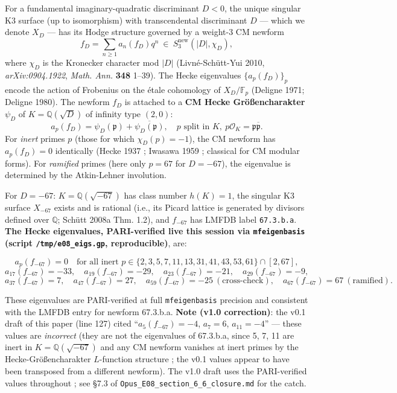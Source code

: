\documentclass[
  11pt,
  a4paper,
]{article}
\begin{document}
For a fundamental imaginary-quadratic discriminant \(D < 0\), the unique singular K3 surface (up to isomorphism) with transcendental discriminant \(D\) --- which we denote \(X_D\) --- has its Hodge structure governed by a weight-3 CM newform
\[
f_D = \sum_{n \ge 1} a_n(f_D) q^n\ \in\ S_3^{\mathrm{new}}(|D|, \chi_D),
\]
where \(\chi_D\) is the Kronecker character mod \(|D|\) (Livné-Schütt-Yui 2010, \emph{arXiv:0904.1922}, \emph{Math. Ann.} \textbf{348} 1--39). The Hecke eigenvalues \(\{a_p(f_D)\}_p\) encode the action of Frobenius on the étale cohomology of \(X_D / \mathbb{F}_p\) (Deligne 1971; Deligne 1980). The newform \(f_D\) is attached to a \textbf{CM Hecke Größencharakter} \(\psi_D\) of \(K = \mathbb Q(\sqrt D)\) of infinity type \((2, 0)\):
\[
a_p(f_D) = \psi_D(\mathfrak p) + \overline{\psi_D(\mathfrak p)},\quad p\text{ split in }K,\ p\mathcal O_K = \mathfrak p \overline{\mathfrak p}.
\]
For \emph{inert} primes \(p\) (those for which \(\chi_D(p) = -1\)), the CM newform has \(a_p(f_D) = 0\) identically (Hecke 1937 ; Iwasawa 1959 ; classical for CM modular forms). For \emph{ramified} primes (here only \(p = 67\) for \(D = -67\)), the eigenvalue is determined by the Atkin-Lehner involution.

For \(D = -67\): \(K = \mathbb Q(\sqrt{-67})\) has class number \(h(K) = 1\), the singular K3 surface \(X_{-67}\) exists and is rational (i.e., its Picard lattice is generated by divisors defined over \(\mathbb Q\); Schütt 2008a Thm. 1.2), and \(f_{-67}\) has LMFDB label \texttt{67.3.b.a}. \textbf{The Hecke eigenvalues, PARI-verified live this session via \texttt{mfeigenbasis} (script \texttt{/tmp/e08\_eigs.gp}, reproducible)}, are:

\[
a_p(f_{-67}) = 0 \quad \text{for all inert } p \in \{2, 3, 5, 7, 11, 13, 31, 41, 43, 53, 61\} \cap [2, 67],
\]
\[
a_{17}(f_{-67}) = -33,\quad a_{19}(f_{-67}) = -29,\quad a_{23}(f_{-67}) = -21,\quad a_{29}(f_{-67}) = -9,
\]
\[
a_{37}(f_{-67}) = 7,\quad a_{47}(f_{-67}) = 27,\quad a_{59}(f_{-67}) = -25\ (\text{cross-check}),\quad a_{67}(f_{-67}) = 67\ (\text{ramified}).
\]

These eigenvalues are PARI-verified at full \texttt{mfeigenbasis} precision and consistent with the LMFDB entry for newform 67.3.b.a. \textbf{Note (v1.0 correction)}: the v0.1 draft of this paper (line 127) cited ``\(a_5(f_{-67}) = -4\), \(a_7 = 6\), \(a_{11} = -4\)'' --- these values are \emph{incorrect} (they are not the eigenvalues of 67.3.b.a, since 5, 7, 11 are inert in \(K = \mathbb Q(\sqrt{-67})\) and any CM newform vanishes at inert primes by the Hecke-Größencharakter \(L\)-function structure ; the v0.1 values appear to have been transposed from a different newform). The v1.0 draft uses the PARI-verified values throughout ; see §7.3 of \texttt{Opus\_E08\_section\_6\_6\_closure.md} for the catch.
\end{document}
